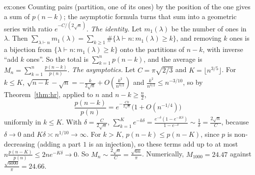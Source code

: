 \begin{solution}{ex:ones}
\idea Counting pairs (partition, one of its ones) by the position of the one gives a sum of $p(n-k)$; the asymptotic formula turns that sum into a geometric series with ratio $e^{-C/(2\sqrt n)}$.
\writeup \emph{The identity.} Let $m_1(\lambda)$ be the number of ones in $\lambda$. Then $\sum_{\lambda\vdash n}m_1(\lambda)=\sum_{k\ge1}\#\{\lambda\vdash n:m_1(\lambda)\ge k\}$, and removing $k$ ones is a bijection from $\{\lambda\vdash n:m_1(\lambda)\ge k\}$ onto the partitions of $n-k$, with inverse ``add $k$ ones''. So the total is $\sum_{k=1}^np(n-k)$, and the average is $M_n=\sum_{k=1}^n\frac{p(n-k)}{p(n)}$.
\emph{The asymptotics.} Let $C=\pi\sqrt{2/3}$ and $K=\lfloor n^{3/5}\rfloor$. For $k\le K$, $\sqrt{n-k}-\sqrt n=-\frac k{2\sqrt n}+O(\frac{k^2}{n^{3/2}})$ and $\frac{k^2}{n^{3/2}}\le n^{-3/10}$, so by Theorem~\ref{thm:hr}, applied to $n$ and $n-k\ge\frac n2$,
\[
\frac{p(n-k)}{p(n)}=e^{-\frac{Ck}{2\sqrt n}}\bigl(1+O(n^{-1/4})\bigr)
\]
uniformly in $k\le K$. With $\delta=\frac C{2\sqrt n}$, $\sum_{k=1}^Ke^{-k\delta}=\frac{e^{-\delta}(1-e^{-K\delta})}{1-e^{-\delta}}\sim\frac1\delta=\frac{2\sqrt n}C$, because $\delta\to0$ and $K\delta\asymp n^{1/10}\to\infty$. For $k>K$, $p(n-k)\le p(n-K)$, since $p$ is non-decreasing (adding a part $1$ is an injection), so these terms add up to at most $n\frac{p(n-K)}{p(n)}\le2ne^{-K\delta}\to0$. So $M_n\sim\frac{2\sqrt n}C=\frac{\sqrt{6n}}\pi$. Numerically, $M_{1000}=24.47$ against $\frac{\sqrt{6000}}\pi=24.66$.
\end{solution}

